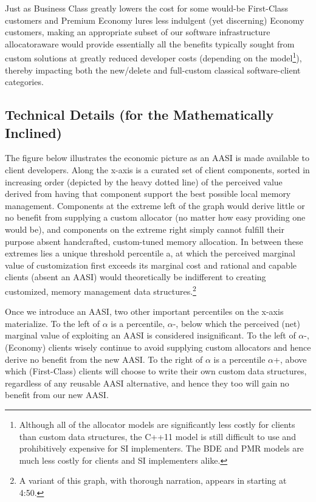 
Just as Business Class greatly lowers the cost for some would-be First-Class
customers and Premium Economy lures less indulgent (yet discerning) Economy
customers, making an appropriate subset of our software infrastructure allocatoraware would provide essentially all the benefits typically sought from custom
solutions at greatly reduced developer costs (depending on the model\footnote{Although all of the allocator models are significantly less costly for clients than custom data
structures, the C++11 model is still difficult to use and prohibitively expensive for SI implementers.
The BDE and PMR models are much less costly for clients and SI implementers alike.}), thereby
impacting both the new/delete and full-custom classical software-client categories.

\subsection{Technical Details (for the Mathematically Inclined)}
The figure below illustrates the economic picture as an AASI is made available to
client developers. Along the x-axis is a curated set of client components, sorted in
increasing order (depicted by the heavy dotted line) of the perceived value derived
from having that component support the best possible local memory management.
Components at the extreme left of the graph would derive little or no benefit from
supplying a custom allocator (no matter how easy providing one would be), and
components on the extreme right simply cannot fulfill their purpose absent
handcrafted, custom-tuned memory allocation. In between these extremes lies a
unique threshold percentile a, at which the perceived marginal value of
customization first exceeds its marginal cost and rational and capable clients
(absent an AASI) would theoretically be indifferent to creating customized,
memory management data structures.\footnote{A variant of this graph, with
thorough narration, appears in \cite{lakos19} starting at 4:50.}



Once we introduce an AASI, two other important percentiles on the x-axis
materialize. To the left of $\alpha$ is a percentile, $\alpha$-, below which the perceived (net)
marginal value of exploiting an AASI is considered insignificant. To the left of $\alpha$-,
(Economy) clients wisely continue to avoid supplying custom allocators and hence
derive no benefit from the new AASI. To the right of $\alpha$ is a percentile $\alpha$+, above which
(First-Class) clients will choose to write their own custom data structures, regardless
of any reusable AASI alternative, and hence they too will gain no benefit from our
new AASI.

